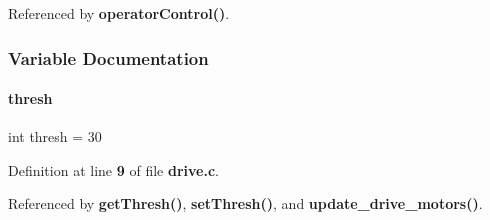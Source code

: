 Referenced by \textbf{ operator\+Control()}.



\subsubsection{Variable Documentation}
\mbox{\label{drive_8c_a6cf8bf160a02413bc3d5d18b0294b581}} 
\paragraph{thresh}
{\footnotesize\ttfamily int thresh = 30\hspace{0.3cm}{\ttfamily [static]}}



Definition at line \textbf{ 9} of file \textbf{ drive.\+c}.



Referenced by \textbf{ get\+Thresh()}, \textbf{ set\+Thresh()}, and \textbf{ update\+\_\+drive\+\_\+motors()}.


